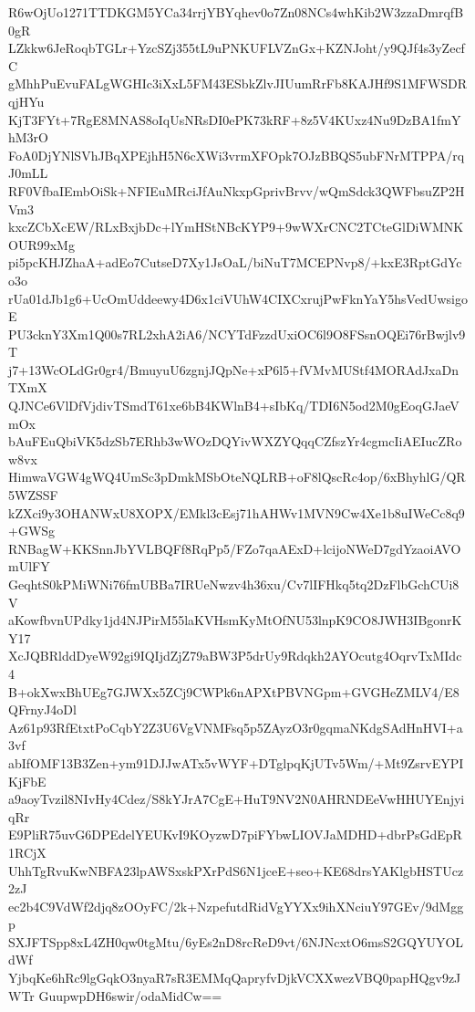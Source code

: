 R6wOjUo1271TTDKGM5YCa34rrjYBYqhev0o7Zn08NCs4whKib2W3zzaDmrqfB0gR
LZkkw6JeRoqbTGLr+YzcSZj355tL9uPNKUFLVZnGx+KZNJoht/y9QJf4s3yZecfC
gMhhPuEvuFALgWGHIc3iXxL5FM43ESbkZlvJIUumRrFb8KAJHf9S1MFWSDRqjHYu
KjT3FYt+7RgE8MNAS8oIqUsNRsDI0ePK73kRF+8z5V4KUxz4Nu9DzBA1fmYhM3rO
FoA0DjYNlSVhJBqXPEjhH5N6cXWi3vrmXFOpk7OJzBBQS5ubFNrMTPPA/rqJ0mLL
RF0VfbaIEmbOiSk+NFIEuMRciJfAuNkxpGprivBrvv/wQmSdck3QWFbsuZP2HVm3
kxcZCbXcEW/RLxBxjbDc+lYmHStNBcKYP9+9wWXrCNC2TCteGlDiWMNKOUR99xMg
pi5pcKHJZhaA+adEo7CutseD7Xy1JsOaL/biNuT7MCEPNvp8/+kxE3RptGdYco3o
rUa01dJb1g6+UcOmUddeewy4D6x1ciVUhW4CIXCxrujPwFknYaY5hsVedUwsigoE
PU3cknY3Xm1Q00s7RL2xhA2iA6/NCYTdFzzdUxiOC6l9O8FSsnOQEi76rBwjlv9T
j7+13WcOLdGr0gr4/BmuyuU6zgnjJQpNe+xP6l5+fVMvMUStf4MORAdJxaDnTXmX
QJNCe6VlDfVjdivTSmdT61xe6bB4KWlnB4+sIbKq/TDI6N5od2M0gEoqGJaeVmOx
bAuFEuQbiVK5dzSb7ERhb3wWOzDQYivWXZYQqqCZfszYr4cgmcIiAEIucZRow8vx
HimwaVGW4gWQ4UmSc3pDmkMSbOteNQLRB+oF8lQscRc4op/6xBhyhlG/QR5WZSSF
kZXci9y3OHANWxU8XOPX/EMkl3cEsj71hAHWv1MVN9Cw4Xe1b8uIWeCc8q9+GWSg
RNBagW+KKSnnJbYVLBQFf8RqPp5/FZo7qaAExD+lcijoNWeD7gdYzaoiAVOmUlFY
GeqhtS0kPMiWNi76fmUBBa7IRUeNwzv4h36xu/Cv7lIFHkq5tq2DzFlbGchCUi8V
aKowfbvnUPdky1jd4NJPirM55laKVHsmKyMtOfNU53lnpK9CO8JWH3IBgonrKY17
XcJQBRlddDyeW92gi9IQIjdZjZ79aBW3P5drUy9Rdqkh2AYOcutg4OqrvTxMIdc4
B+okXwxBhUEg7GJWXx5ZCj9CWPk6nAPXtPBVNGpm+GVGHeZMLV4/E8QFrnyJ4oDl
Az61p93RfEtxtPoCqbY2Z3U6VgVNMFsq5p5ZAyzO3r0gqmaNKdgSAdHnHVI+a3vf
abIfOMF13B3Zen+ym91DJJwATx5vWYF+DTglpqKjUTv5Wm/+Mt9ZsrvEYPIKjFbE
a9aoyTvzil8NIvHy4Cdez/S8kYJrA7CgE+HuT9NV2N0AHRNDEeVwHHUYEnjyiqRr
E9PliR75uvG6DPEdelYEUKvI9KOyzwD7piFYbwLIOVJaMDHD+dbrPsGdEpR1RCjX
UhhTgRvuKwNBFA23lpAWSxskPXrPdS6N1jceE+seo+KE68drsYAKlgbHSTUcz2zJ
ec2b4C9VdWf2djq8zOOyFC/2k+NzpefutdRidVgYYXx9ihXNciuY97GEv/9dMggp
SXJFTSpp8xL4ZH0qw0tgMtu/6yEs2nD8rcReD9vt/6NJNcxtO6msS2GQYUYOLdWf
YjbqKe6hRc9lgGqkO3nyaR7sR3EMMqQapryfvDjkVCXXwezVBQ0papHQgv9zJWTr
GuupwpDH6swir/odaMidCw==
